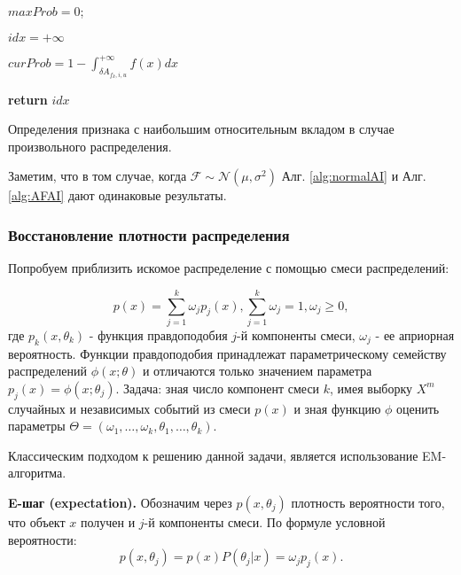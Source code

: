 \documentclass[12pt,a4paper]{report}
\begin{document}
\begin{algorithm}[H]
\SetAlgoLined
{}

$maxProb = 0$;

$idx = +\infty$

 {

$curProb = 1 - \int_{\delta A_{f_k, i, u}}^{+\infty}f(x)dx$

}

\textbf{return} $idx$
\caption{Определения признака с наибольшим относительным вкладом в случае произвольного распределения.}
\label{alg:AFAI}
\end{algorithm}

Заметим, что в том случае, когда $\mathcal{F} \sim \mathcal{N}(\mu, \sigma^2)$ Алг. \ref{alg:normalAI} и Алг. \ref{alg:AFAI} дают одинаковые результаты.

\subsubsection{Восстановление плотности распределения}
Попробуем приблизить искомое распределение с помощью смеси распределений:

\begin{equation*}
p(x) = \sum_{j=1}^{k}\omega_jp_j(x), \sum_{j=1}^{k}\omega_j = 1, \omega_j \ge 0, 
\end{equation*}
где $p_k(x, \theta_k)$ - функция правдоподобия $j$-й компоненты смеси, $\omega_j$ - ее априорная вероятность. Функции правдоподобия принадлежат параметрическому семейству распределений $\phi(x; \theta)$ и отличаются только значением параметра $p_j(x) = \phi(x; \theta_j)$.
Задача: зная число компонент смеси $k$, имея выборку $X^m$ случайных и независимых событий из смеси $p(x)$ и зная функцию $\phi$ оценить параметры $\Theta = (\omega_1, \dots, \omega_k, \theta_1, \dots, \theta_k)$.

Классическим подходом к решению данной задачи, является использование EM-алгоритма.

\textbf{E-шаг (expectation).}
Обозначим через $p(x, \theta_j)$ плотность вероятности того, что объект $x$ получен и $j$-й компоненты смеси. По формуле условной вероятности:
\begin{equation*}
p(x, \theta_j) = p(x)P(\theta_j|x) = \omega_jp_j(x).
\end{equation*} 
\end{document}
